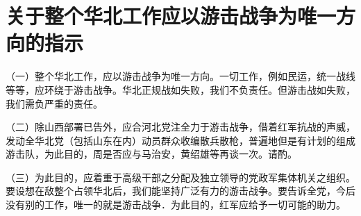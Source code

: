 \section[关于整个华北工作应以游击战争为唯一方向的指示（一九三七年九月二十五日）]{关于整个华北工作应以游击战争为唯一方向的指示}


（一）整个华北工作，应以游击战争为唯一方向。一切工作，例如民运，统一战线等等，应环绕于游击战争。华北正规战如失败，我们不负责任。但游击战如失败，我们需负严重的责任。

（二）除山西部署已告外，应合河北党注全力于游击战争，借着红军抗战的声威，发动全华北党（包括山东在内）动员群众收编散兵散枪，普遍地但是有计划的组成游击队，为此目的，周是否应与马治安，黄绍雄等再谈一次。请酌。

（三）为此目的，应着重于高级干部之分配及独立领导的党政军集体机关之组织。要设想在敌整个占领华北后，我们能坚持广泛有力的游击战争。要告诉全党，今后没有别的工作，唯一的就是游击战争．为此目的，红军应给予一切可能的助力。

